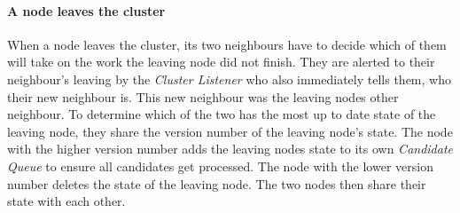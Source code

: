 \paragraph{A node leaves the cluster}
When a node leaves the cluster, its two neighbours have to decide which of them will take on the work the leaving node did not finish. 
They are alerted to their neighbour's leaving by the \emph{Cluster Listener} who also immediately tells them, who their new neighbour is. 
This new neighbour was the leaving nodes other neighbour.
To determine which of the two has the most up to date state of the leaving node, they share the version number of the leaving node's state. 
The node with the higher version number adds the leaving nodes state to its own \emph{Candidate Queue} to ensure all candidates get processed. 
The node with the lower version number deletes the state of the leaving node.
The two nodes then share their state with each other. 